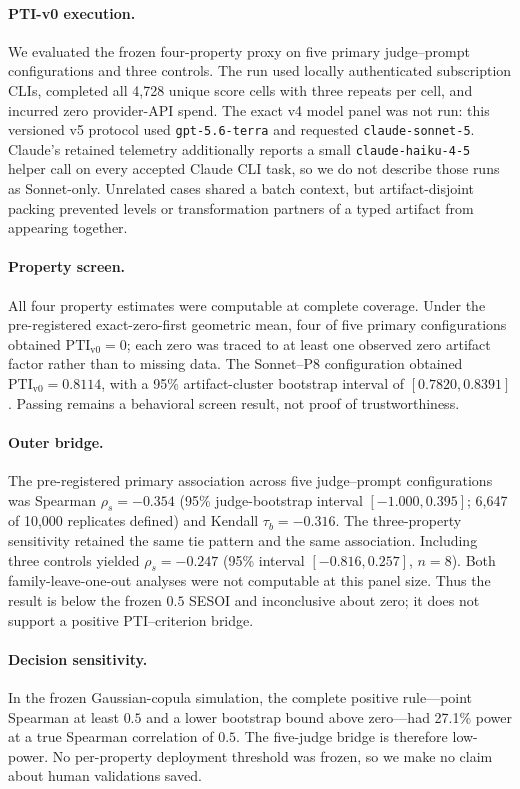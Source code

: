 
\paragraph{PTI-v0 execution.}
We evaluated the frozen four-property proxy on five primary judge--prompt
configurations and three controls.  The run used locally authenticated
subscription CLIs, completed all 4,728 unique score cells with three repeats
per cell, and incurred zero provider-API spend.  The exact v4 model panel was
not run: this versioned v5 protocol used \texttt{gpt-5.6-terra} and requested
\texttt{claude-sonnet-5}.  Claude's retained telemetry additionally reports a
small \texttt{claude-haiku-4-5} helper call on every accepted Claude CLI task, so we do
not describe those runs as Sonnet-only.  Unrelated cases shared a batch context,
but artifact-disjoint packing prevented levels or transformation partners of a
typed artifact from appearing together.

\paragraph{Property screen.}
All four property estimates were computable at complete coverage.  Under the
pre-registered exact-zero-first geometric mean, four of five primary
configurations obtained \(\mathrm{PTI}_{\mathrm{v0}}=0\); each zero was traced
to at least one observed zero artifact factor rather than to missing data.  The
Sonnet--P8 configuration obtained
\(\mathrm{PTI}_{\mathrm{v0}}=0.8114\), with a 95\% artifact-cluster bootstrap
interval of \([0.7820,0.8391]\).  Passing remains a behavioral screen result,
not proof of trustworthiness.

\paragraph{Outer bridge.}
The pre-registered primary association across five judge--prompt
configurations was Spearman
\(\rho_s=-0.354\) (95\% judge-bootstrap interval
\([-1.000,0.395]\); 6,647 of 10,000 replicates defined) and Kendall
\(\tau_b=-0.316\).  The three-property sensitivity retained the same tie
pattern and the same association.  Including three controls yielded
\(\rho_s=-0.247\) (95\% interval \([-0.816,0.257]\), \(n=8\)).  Both
family-leave-one-out analyses were not computable at this panel size.  Thus the
result is below the frozen \(0.5\) SESOI and inconclusive about zero; it does not
support a positive PTI--criterion bridge.

\paragraph{Decision sensitivity.}
In the frozen Gaussian-copula simulation, the complete positive rule---point
Spearman at least \(0.5\) and a lower bootstrap bound above zero---had 27.1\%
power at a true Spearman correlation of \(0.5\).  The five-judge bridge is
therefore low-power.  No per-property deployment threshold was frozen, so we
make no claim about human validations saved.
